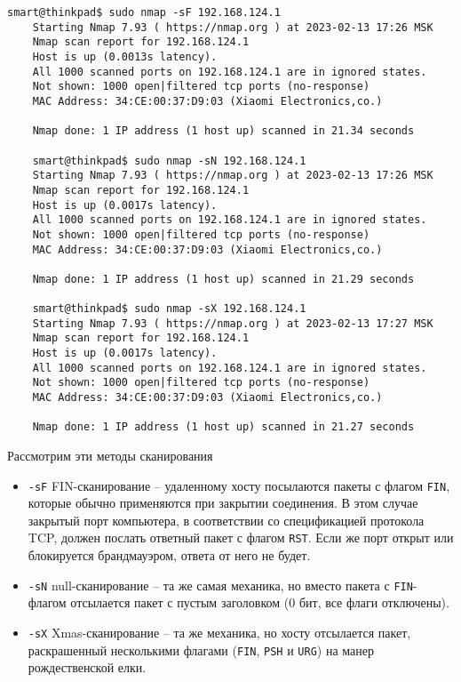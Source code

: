 \begin{Verbatim}[frame=single,breaklines=true,breakanywhere=true]
    smart@thinkpad$ sudo nmap -sF 192.168.124.1
    Starting Nmap 7.93 ( https://nmap.org ) at 2023-02-13 17:26 MSK
    Nmap scan report for 192.168.124.1
    Host is up (0.0013s latency).
    All 1000 scanned ports on 192.168.124.1 are in ignored states.
    Not shown: 1000 open|filtered tcp ports (no-response)
    MAC Address: 34:CE:00:37:D9:03 (Xiaomi Electronics,co.)

    Nmap done: 1 IP address (1 host up) scanned in 21.34 seconds

    smart@thinkpad$ sudo nmap -sN 192.168.124.1
    Starting Nmap 7.93 ( https://nmap.org ) at 2023-02-13 17:26 MSK
    Nmap scan report for 192.168.124.1
    Host is up (0.0017s latency).
    All 1000 scanned ports on 192.168.124.1 are in ignored states.
    Not shown: 1000 open|filtered tcp ports (no-response)
    MAC Address: 34:CE:00:37:D9:03 (Xiaomi Electronics,co.)

    Nmap done: 1 IP address (1 host up) scanned in 21.29 seconds

    smart@thinkpad$ sudo nmap -sX 192.168.124.1
    Starting Nmap 7.93 ( https://nmap.org ) at 2023-02-13 17:27 MSK
    Nmap scan report for 192.168.124.1
    Host is up (0.0017s latency).
    All 1000 scanned ports on 192.168.124.1 are in ignored states.
    Not shown: 1000 open|filtered tcp ports (no-response)
    MAC Address: 34:CE:00:37:D9:03 (Xiaomi Electronics,co.)

    Nmap done: 1 IP address (1 host up) scanned in 21.27 seconds
\end{Verbatim}

Рассмотрим эти методы сканирования
\begin{itemize}
    \item \texttt{-sF} FIN-сканирование -- удаленному хосту посылаются пакеты с флагом \texttt{FIN}, которые обычно применяются при закрытии соединения. В этом случае закрытый порт компьютера, в соответствии со спецификацией протокола TCP, должен послать ответный пакет с флагом \texttt{RST}. Если же порт открыт или блокируется брандмауэром, ответа от него не будет.
    \item \texttt{-sN} null-сканирование -- та же самая механика, но вместо пакета с \texttt{FIN}-флагом отсылается пакет с пустым заголовком (0 бит, все флаги отключены).
    \item \texttt{-sX} Xmas-сканирование -- та же механика, но хосту отсылается пакет, раскрашенный несколькими флагами (\texttt{FIN}, \texttt{PSH} и \texttt{URG}) на манер рождественской елки.
\end{itemize}

